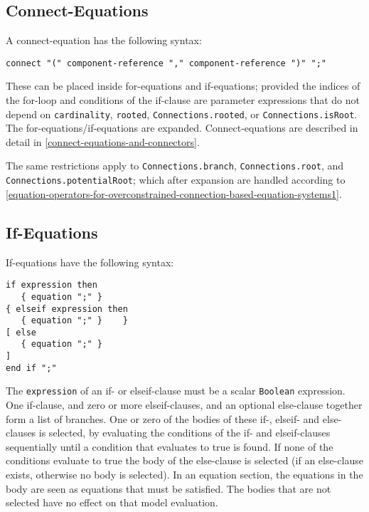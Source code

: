 \subsection{Connect-Equations}\label{connect-equations}

A connect-equation has the following syntax:
\begin{lstlisting}[language=grammar]
connect "(" component-reference "," component-reference ")" ";"
\end{lstlisting}

These can be placed inside for-equations and if-equations; provided the indices of the for-loop and conditions of the if-clause are parameter expressions that do not depend on \lstinline!cardinality!, \lstinline!rooted!, \lstinline!Connections.rooted!, or \lstinline!Connections.isRoot!.  The for-equations/if-equations are expanded.  Connect-equations are described in detail in \cref{connect-equations-and-connectors}.

The same restrictions apply to \lstinline!Connections.branch!, \lstinline!Connections.root!, and \lstinline!Connections.potentialRoot!; which after expansion are handled according to \cref{equation-operators-for-overconstrained-connection-based-equation-systems1}.

\subsection{If-Equations}\label{if-equations}

If-equations have the following syntax:
\begin{lstlisting}[language=grammar]
if expression then
   { equation ";" }
{ elseif expression then
   { equation ";" }    }
[ else
   { equation ";" }
]
end if ";"
\end{lstlisting}

The \lstinline!expression! of an if- or elseif-clause must be a scalar \lstinline!Boolean! expression.  One if-clause, and zero or more elseif-clauses, and an optional else-clause together form a list of branches.  One or zero of the bodies of these if-, elseif- and else-clauses is selected, by evaluating the conditions of the if- and elseif-clauses sequentially until a condition that evaluates to true is found.  If none of the conditions evaluate to true the body of the else-clause is selected (if an else-clause exists, otherwise no body is selected).  In an equation section, the equations in the body are seen as equations that must be satisfied.  The bodies that are not selected have no effect on that model evaluation.

